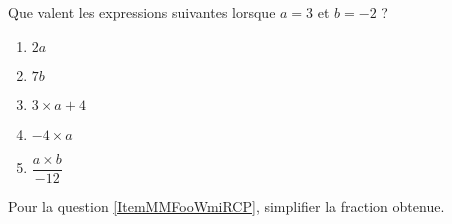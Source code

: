 
\begin{exercice}\label{exosmath-0896}

    Que valent les expressions suivantes lorsque \( a=3\) et \( b=-2\) ?
    \begin{multicols}{2}
        \begin{enumerate}
            \item
                \( 2a\)
            \item
                \( 7b\)
            \item
                \( 3\times a+4\)
            \item
                \(  -4\times a\)
            \item   \label{ItemMMFooWmiRCP}
                \( \dfrac{ a\times b }{ -12 }\)
        \end{enumerate}
    \end{multicols}
    Pour la question \ref{ItemMMFooWmiRCP}, simplifier la fraction obtenue.

\end{exercice}
